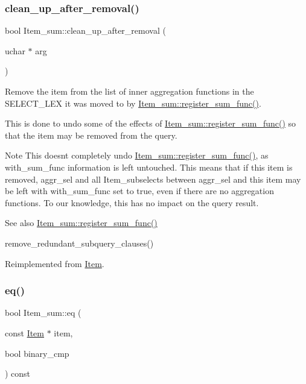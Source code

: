 \subsubsection{\texorpdfstring{clean\+\_\+up\+\_\+after\+\_\+removal()}{clean\_up\_after\_removal()}}
{\footnotesize\ttfamily bool Item\+\_\+sum\+::clean\+\_\+up\+\_\+after\+\_\+removal (\begin{DoxyParamCaption}\item[{uchar $\ast$}]{arg }\end{DoxyParamCaption})\hspace{0.3cm}{\ttfamily [virtual]}}

Remove the item from the list of inner aggregation functions in the S\+E\+L\+E\+C\+T\+\_\+\+L\+EX it was moved to by \mbox{\hyperlink{classItem__sum_a15a75b6a683912f8222f7091b3714ec8}{Item\+\_\+sum\+::register\+\_\+sum\+\_\+func()}}.

This is done to undo some of the effects of \mbox{\hyperlink{classItem__sum_a15a75b6a683912f8222f7091b3714ec8}{Item\+\_\+sum\+::register\+\_\+sum\+\_\+func()}} so that the item may be removed from the query.

\begin{DoxyNote}{Note}
This doesn\textquotesingle{}t completely undo \mbox{\hyperlink{classItem__sum_a15a75b6a683912f8222f7091b3714ec8}{Item\+\_\+sum\+::register\+\_\+sum\+\_\+func()}}, as with\+\_\+sum\+\_\+func information is left untouched. This means that if this item is removed, aggr\+\_\+sel and all Item\+\_\+subselects between aggr\+\_\+sel and this item may be left with with\+\_\+sum\+\_\+func set to true, even if there are no aggregation functions. To our knowledge, this has no impact on the query result.
\end{DoxyNote}
\begin{DoxySeeAlso}{See also}
\mbox{\hyperlink{classItem__sum_a15a75b6a683912f8222f7091b3714ec8}{Item\+\_\+sum\+::register\+\_\+sum\+\_\+func()}} 

remove\+\_\+redundant\+\_\+subquery\+\_\+clauses() 
\end{DoxySeeAlso}


Reimplemented from \mbox{\hyperlink{classItem_a649bf72a4ae639e262d147cf5beaa30a}{Item}}.

\mbox{\label{classItem__sum_aeab749252b834e0be4f00aac8ca523f5}} 
\subsubsection{\texorpdfstring{eq()}{eq()}}
{\footnotesize\ttfamily bool Item\+\_\+sum\+::eq (\begin{DoxyParamCaption}\item[{const \mbox{\hyperlink{classItem}{Item}} $\ast$}]{item,  }\item[{bool}]{binary\+\_\+cmp }\end{DoxyParamCaption}) const\hspace{0.3cm}{\ttfamily [virtual]}}

